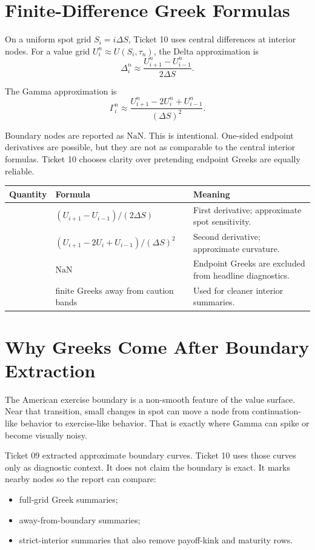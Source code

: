 \documentclass[11pt,a4paper]{article}
\begin{document}
\section{Finite-Difference Greek Formulas}

On a uniform spot grid \(S_i=i\Delta S\), Ticket 10 uses central differences at interior nodes.
For a value grid \(U_i^n \approx U(S_i,\tau_n)\), the Delta approximation is
\[
\Delta_i^n \approx \frac{U_{i+1}^n - U_{i-1}^n}{2\Delta S}.
\]

The Gamma approximation is
\[
\Gamma_i^n \approx \frac{U_{i+1}^n - 2U_i^n + U_{i-1}^n}{(\Delta S)^2}.
\]

Boundary nodes are reported as \(\mathrm{NaN}\). This is intentional. One-sided endpoint
derivatives are possible, but they are not as comparable to the central interior formulas. Ticket
10 chooses clarity over pretending endpoint Greeks are equally reliable.

\begin{longtable}{P{0.25\textwidth}L{0.28\textwidth}L{0.35\textwidth}}
\toprule
Quantity & Formula & Meaning \\
\midrule
\endhead
{} & \(\left(U_{i+1}-U_{i-1}\right)/(2\Delta S)\) & First derivative; approximate spot sensitivity. \\
 & \(\left(U_{i+1}-2U_i+U_{i-1}\right)/(\Delta S)^2\) & Second derivative; approximate curvature. \\
 & \(\mathrm{NaN}\) & Endpoint Greeks are excluded from headline diagnostics. \\
 & finite Greeks away from caution bands & Used for cleaner interior summaries. \\
\bottomrule
\end{longtable}

\section{Why Greeks Come After Boundary Extraction}

The American exercise boundary is a non-smooth feature of the value surface. Near that transition,
small changes in spot can move a node from continuation-like behavior to exercise-like behavior.
That is exactly where Gamma can spike or become visually noisy.

Ticket 09 extracted approximate boundary curves. Ticket 10 uses those curves only as diagnostic
context. It does not claim the boundary is exact. It marks nearby nodes so the report can compare:
\begin{itemize}
  \item full-grid Greek summaries;
  \item away-from-boundary summaries;
  \item strict-interior summaries that also remove payoff-kink and maturity rows.
\end{itemize}
\end{document}
